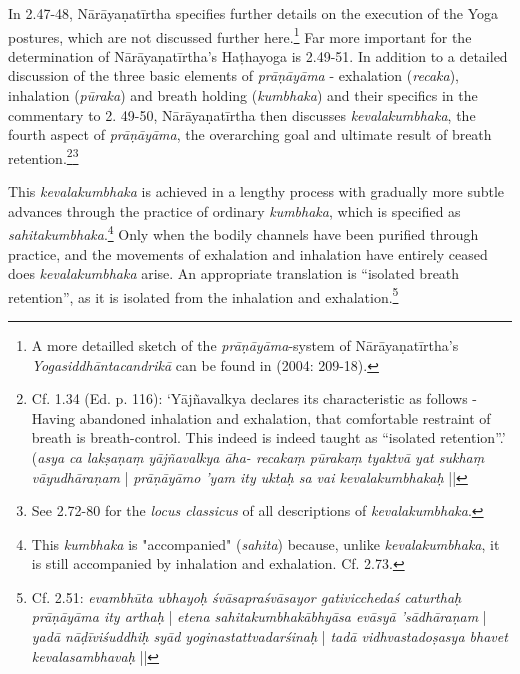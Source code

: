 In 2.47-48, Nārāyaṇatīrtha specifies further details on the execution of the Yoga postures, which are not discussed further here.\footnote{A more detailled sketch of the \textit{prāṇāyāma}-system of Nārāyaṇatīrtha's \textit{Yogasiddhāntacandrikā} can be found in \citeauthor{penna2004} (2004: 209-18).} Far more important for the determination of Nārāyaṇatīrtha's Haṭhayoga is 2.49-51. In addition to a detailed discussion of the three basic elements of \textit{prāṇāyāma} - exhalation (\textit{recaka}), inhalation (\textit{pūraka}) and breath holding (\textit{kumbhaka}) and their specifics in the commentary to 2. 49-50, Nārāyaṇatīrtha then discusses \textit{kevalakumbhaka}, the fourth aspect of \textit{prāṇāyāma}, the overarching goal and ultimate result of breath retention.\footnote{Cf.  1.34 (Ed. p. 116): `Yājñavalkya declares its characteristic as follows - Having abandoned inhalation and exhalation, that comfortable restraint of breath is breath-control. This indeed is indeed taught as ``isolated retention''.' (\textit{asya ca lakṣaṇaṃ yājñavalkya āha- recakaṃ pūrakaṃ tyaktvā yat sukhaṃ vāyudhāraṇam} | \textit{prāṇāyāmo 'yam ity uktaḥ sa vai kevalakumbhakaḥ} ||}\footnote{See  2.72-80 for the \textit{locus classicus} of all descriptions of \textit{kevalakumbhaka}.} 

This \textit{kevalakumbhaka} is achieved in a lengthy process with gradually more subtle advances through the practice of ordinary \textit{kumbhaka}, which is specified as \textit{sahitakumbhaka}.\footnote{This \textit{kumbhaka} is "accompanied" (\textit{sahita}) because, unlike \textit{kevalakumbhaka}, it is still accompanied by inhalation and exhalation. Cf.  2.73.} Only when the bodily channels have been purified through practice, and the movements of exhalation and inhalation have entirely ceased does \textit{kevalakumbhaka} arise. An appropriate translation is ``isolated breath retention'', as it is isolated from the inhalation and exhalation.\footnote{Cf.  2.51: \textit{evambhūta ubhayoḥ śvāsapraśvāsayor gativicchedaś caturthaḥ prāṇāyāma ity arthaḥ} | \textit{etena sahitakumbhakābhyāsa evāsyā 'sādhāraṇam} | \textit{yadā nāḍīviśuddhiḥ syād yoginastattvadarśinaḥ} | \textit{tadā vidhvastadoṣasya bhavet kevalasambhavaḥ} ||}

